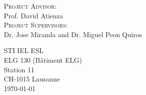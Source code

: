 \begin{titlepage}
    \begin{multicols}{2}
    
    \flushleft
    
    \textsc{Project Advisor:}
    \\
    Prof. David Atienza
    \\ [0.25cm]
    \textsc{Project Supervisors:}
    \\
    Dr. Jose Miranda and Dr. Miguel Peon Quiros
    
    \flushright
    
    STI IEL ESL
    \\
    ELG 130 (Bâtiment ELG)
    \\
    Station 11
    \\
    CH-1015 Lausanne
    \\
    \today
    
    \end{multicols}
\end{titlepage}